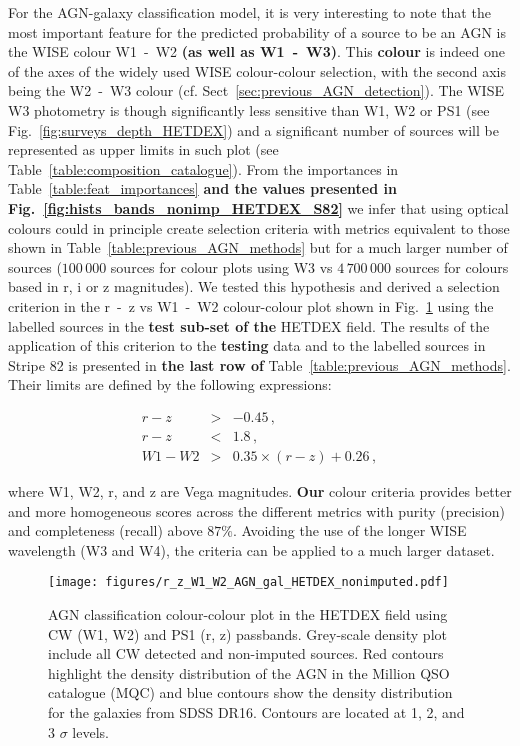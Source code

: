 \documentclass{aa}
\begin{document}
For the AGN-galaxy classification model, it is very interesting to note that the most important feature for the predicted probability of a source to be an AGN is the WISE colour W1~-~W2 \textbf{(as well as W1~-~W3)}. This \textbf{colour} is indeed one of the axes of the widely used WISE colour-colour selection, with the second axis being the W2~-~W3 colour (cf. Sect~\ref{sec:previous_AGN_detection}). The WISE W3 photometry is though significantly less sensitive than W1, W2 or PS1 (see Fig.~\ref{fig:surveys_depth_HETDEX}) and a significant number of sources will be represented as upper limits in such plot (see Table~\ref{table:composition_catalogue}). From the importances in Table~\ref{table:feat_importances} \textbf{and the values presented in Fig.~\ref{fig:hists_bands_nonimp_HETDEX_S82}} we infer that using optical colours could in principle create selection criteria with metrics equivalent to those shown in Table~\ref{table:previous_AGN_methods} but for a much larger number of sources ($100\,000$ sources for colour plots using W3 vs \textbf{$4\,700\,000$} sources for colours based in r, i or z magnitudes). We tested this hypothesis and derived a selection criterion in the r~-~z vs W1~-~W2 colour-colour plot shown in Fig.~\ref{fig:HETDEX_rz_W1W2_AGN_gal_class} using the labelled sources in the \textbf{test sub-set of the} HETDEX field. The results of the application of this criterion to the \textbf{testing} data and to the labelled sources in Stripe 82 is presented in \textbf{the last row of} Table~\ref{table:previous_AGN_methods}. Their limits are defined by the following expressions:

\begin{eqnarray}
r - z &>& -0.45\,,\\
r - z &<& 1.8\,,\\
W1 - W2 &>& 0.35 \times (r - z) + 0.26\,,
\end{eqnarray}

\noindent where W1, W2, r, and z are Vega magnitudes. \textbf{Our} colour criteria provides better and more homogeneous scores across the different metrics with purity (precision) and completeness (recall) above $87\%$. Avoiding the use of the longer WISE wavelength (W3 and W4), the criteria can be applied to a much larger dataset.


\begin{figure}
    \centering
    \begin{minipage}{0.99\columnwidth}
    \texttt{[image: figures/r\_z\_W1\_W2\_AGN\_gal\_HETDEX\_nonimputed.pdf]}
    \end{minipage}%
    \caption{AGN classification colour-colour plot in the HETDEX field using CW (W1, W2) and PS1 (r, z) passbands. Grey-scale density plot include all CW detected and non-imputed sources. Red contours highlight the density distribution of the AGN in the Million QSO catalogue (MQC) and blue contours show the density distribution for the galaxies from SDSS DR16. Contours are located at 1, 2, and 3 $\sigma$ levels.}
   \label{fig:HETDEX_rz_W1W2_AGN_gal_class}
\end{figure}
\end{document}

